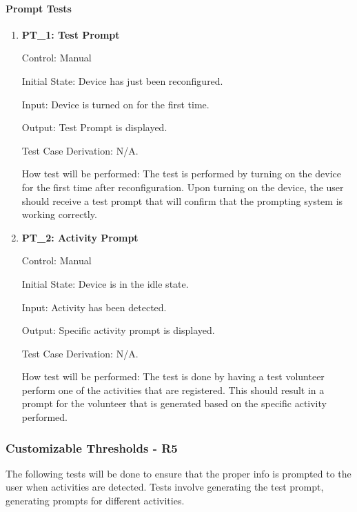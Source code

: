 \documentclass[12pt, titlepage]{article}
\begin{document}
\paragraph{Prompt Tests}
\begin{enumerate}
	\item{\textbf{PT\_1: Test Prompt} \\}
	
		Control: Manual 
							
		Initial State: Device has just been reconfigured.
							
		Input: Device is turned on for the first time.
		
		Output: Test Prompt is displayed.
		
		Test Case Derivation: N/A.
							
		How test will be performed: The test is performed by turning on the device for the first time after reconfiguration. Upon turning on the device, the user should receive a test prompt that will confirm that the 				prompting system is working correctly.

	\item{\textbf{PT\_2: Activity Prompt} \\}
	
		Control: Manual 
							
		Initial State: Device is in the idle state.
							
		Input: Activity has been detected.
		
		Output: Specific activity prompt is displayed.
		
		Test Case Derivation: N/A.
							
		How test will be performed: The test is done by having a test volunteer perform one of the activities that are registered. This should result in a prompt for the volunteer that is generated based on the 					specific activity performed.
\end{enumerate}

\subsubsection{Customizable Thresholds - \textbf{R5}}

The following tests will be done to ensure that the proper info is prompted to the user when activities are detected. Tests involve generating the test prompt, generating prompts for different activities.
		
\end{document}
